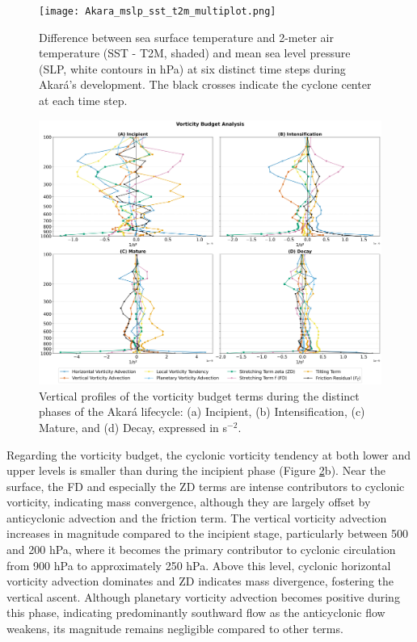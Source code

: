 \documentclass[pdflatex,sn-chicago]{sn-jnl}%
\theoremstyle{plain}
\theoremstyle{definition}
\theoremstyle{remark}
\theoremstyle{definition}
\begin{document}
\begin{figure}[h!]
\centering
\texttt{[image: Akara\_mslp\_sst\_t2m\_multiplot.png]}
\caption{Difference between sea surface temperature and 2-meter air temperature (SST - T2M, shaded) and mean sea level pressure (SLP, white contours in hPa) at six distinct time steps during Akará's development. The black crosses indicate the cyclone center at each time step.}
\label{fig:Akara_mslp_sst_t2m_multiplot}
\end{figure}

\begin{figure}[h!]
\centering
\includegraphics[width=\textwidth]{Vorticity_Budget_Combined_2x2.png}
\caption{Vertical profiles of the vorticity budget terms during the distinct phases of the Akará lifecycle: (a) Incipient, (b) Intensification, (c) Mature, and (d) Decay, expressed in s\(^{-2}\).}
\label{fig:Vorticity_Budget_Combined_2x2}
\end{figure}

Regarding the vorticity budget, the cyclonic vorticity tendency at both lower and upper levels is smaller than during the incipient phase (Figure \ref{fig:Vorticity_Budget_Combined_2x2}b). Near the surface, the FD and especially the ZD terms are intense contributors to cyclonic vorticity, indicating mass convergence, although they are largely offset by anticyclonic advection and the friction term. The vertical vorticity advection increases in magnitude compared to the incipient stage, particularly between 500 and 200 hPa, where it becomes the primary contributor to cyclonic circulation from 900 hPa to approximately 250 hPa. Above this level, cyclonic horizontal vorticity advection dominates and ZD indicates mass divergence, fostering the vertical ascent. Although planetary vorticity advection becomes positive during this phase, indicating predominantly southward flow as the anticyclonic flow weakens, its magnitude remains negligible compared to other terms.
\end{document}

